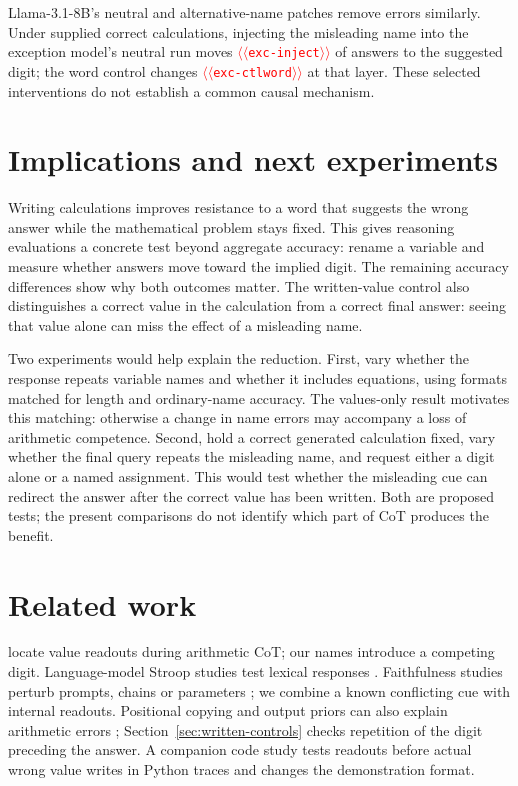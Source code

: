 \documentclass[11pt]{article}
\providecommand{\NUM}[1]{\textcolor{red}{$\langle\langle$\texttt{#1}$\rangle\rangle$}}
\begin{document}
Llama-3.1-8B's neutral and alternative-name patches remove errors similarly.
Under supplied correct calculations, injecting the misleading name into the exception
model's neutral run moves \NUM{exc-inject} of answers to the suggested digit; the word
control changes \NUM{exc-ctlword} at that layer. These selected interventions do not
establish a common causal mechanism.



\section{Implications and next experiments}

Writing calculations improves resistance to a word that suggests the wrong answer while
the mathematical problem stays fixed. This gives reasoning evaluations a concrete test
beyond aggregate accuracy: rename a variable and measure whether answers move toward
the implied digit. The remaining accuracy differences show why both outcomes matter.
The written-value control also distinguishes a correct value in the calculation from
a correct final answer: seeing that value alone can miss the effect of a misleading name.

Two experiments would help explain the reduction. First, vary whether the response
repeats variable names and whether it includes equations, using formats matched for
length and ordinary-name accuracy. The values-only result motivates this matching:
otherwise a change in name errors may accompany a loss of arithmetic competence.
Second, hold a correct generated calculation fixed, vary whether the final query repeats
the misleading name, and request either a digit alone or a named assignment. This would
test whether the misleading cue can redirect the answer after the correct value has
been written. Both are proposed
tests; the present comparisons do not identify which part of CoT produces the benefit.

\section{Related work}

\citet{kudo2026faithful} locate value readouts during arithmetic CoT; our names introduce
a competing digit. Language-model Stroop studies test lexical responses
\cite{wang2026stroop,hu2026conflict}. Faithfulness studies perturb prompts, chains or
parameters \cite{turpin2023unfaithful,lanham2023measuring,chen2025reasoning,tutek2025unlearning};
we combine a known conflicting cue with internal readouts. Positional copying and output priors
can also explain arithmetic errors \cite{liu2026readout,prabhakar2024deciphering};
Section~\ref{sec:written-controls} checks repetition of the digit preceding the answer.
A companion code study \citep{anon2026code} tests readouts before actual wrong value writes
in Python traces and changes the demonstration format.
\end{document}
